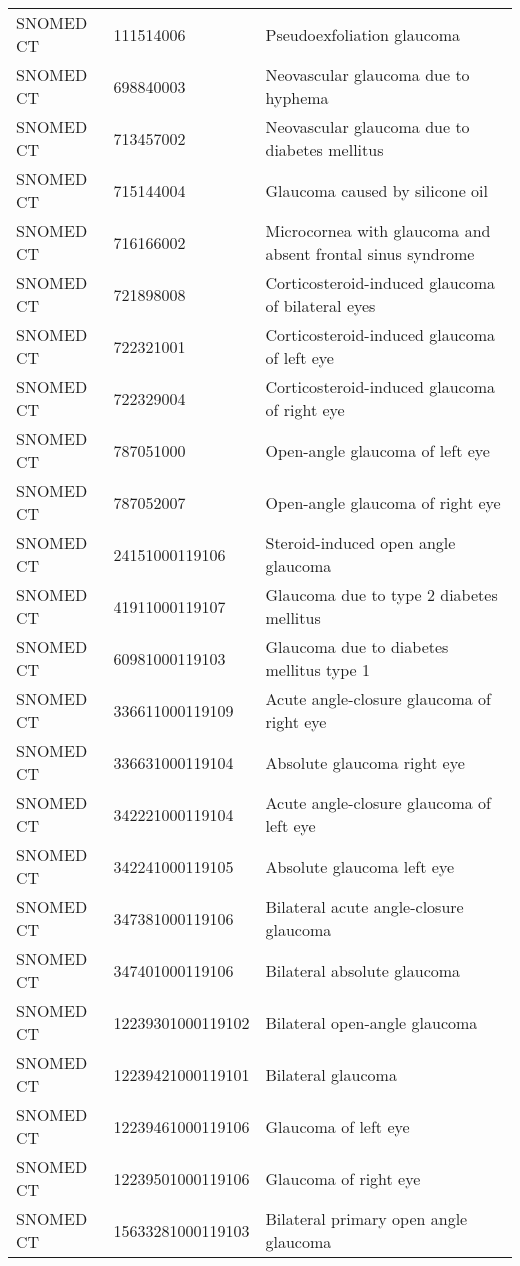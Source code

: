 \begin{longtable}{p{}p{}p{}}
  SNOMED CT & 111514006 & Pseudoexfoliation glaucoma \\ 
  SNOMED CT & 698840003 & Neovascular glaucoma due to hyphema \\ 
  SNOMED CT & 713457002 & Neovascular glaucoma due to diabetes mellitus \\ 
  SNOMED CT & 715144004 & Glaucoma caused by silicone oil \\ 
  SNOMED CT & 716166002 & Microcornea with glaucoma and absent frontal sinus syndrome \\ 
  SNOMED CT & 721898008 & Corticosteroid-induced glaucoma of bilateral eyes \\ 
  SNOMED CT & 722321001 & Corticosteroid-induced glaucoma of left eye \\ 
  SNOMED CT & 722329004 & Corticosteroid-induced glaucoma of right eye \\ 
  SNOMED CT & 787051000 & Open-angle glaucoma of left eye \\ 
  SNOMED CT & 787052007 & Open-angle glaucoma of right eye \\ 
  SNOMED CT & 24151000119106 & Steroid-induced open angle glaucoma \\ 
  SNOMED CT & 41911000119107 & Glaucoma due to type 2 diabetes mellitus \\ 
  SNOMED CT & 60981000119103 & Glaucoma due to diabetes mellitus type 1 \\ 
  SNOMED CT & 336611000119109 & Acute angle-closure glaucoma of right eye \\ 
  SNOMED CT & 336631000119104 & Absolute glaucoma right eye \\ 
  SNOMED CT & 342221000119104 & Acute angle-closure glaucoma of left eye \\ 
  SNOMED CT & 342241000119105 & Absolute glaucoma left eye \\ 
  SNOMED CT & 347381000119106 & Bilateral acute angle-closure glaucoma \\ 
  SNOMED CT & 347401000119106 & Bilateral absolute glaucoma \\ 
  SNOMED CT & 12239301000119102 & Bilateral open-angle glaucoma \\ 
  SNOMED CT & 12239421000119101 & Bilateral glaucoma \\ 
  SNOMED CT & 12239461000119106 & Glaucoma of left eye \\ 
  SNOMED CT & 12239501000119106 & Glaucoma of right eye \\ 
  SNOMED CT & 15633281000119103 & Bilateral primary open angle glaucoma \\ 

\end{longtable}
